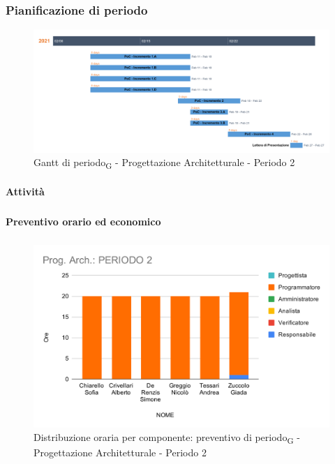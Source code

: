 \subsubsection{Pianificazione di periodo}

\begin{figure}[H]
	\centering
	\includegraphics[scale=0.37]{res/images/gantt_periodo/progarch_2_gantt.png}
	\caption{Gantt di periodo\textsubscript{G} - Progettazione Architetturale - Periodo 2}
\end{figure}

\paragraph{Attività}
\subparagraph*{}

\planningTable{
	
}


\paragraph{Preventivo orario ed economico}
\subparagraph*{}

\contabilitaTable{
	
}

\begin{figure}[H]
	\centering
	\includegraphics[scale=2]{res/images/charts/preventivo/prog_arch_2.png}
	\caption{Distribuzione oraria per componente: preventivo di periodo\textsubscript{G} - Progettazione Architetturale - Periodo 2}
\end{figure}

